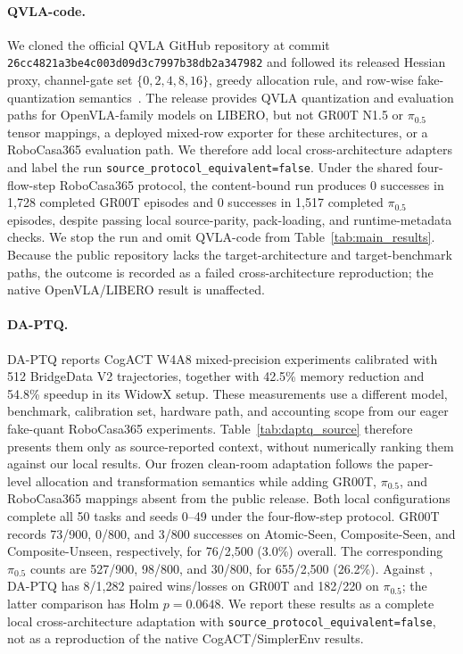 \paragraph{QVLA-code.}
We cloned the official QVLA GitHub repository at commit \texttt{26cc4821a3be4c003d09d3c7997b38db2a347982} and followed its released Hessian proxy, channel-gate set $\{0,2,4,8,16\}$, greedy allocation rule, and row-wise fake-quantization semantics~\citep{xu2026qvla}. The release provides QVLA quantization and evaluation paths for OpenVLA-family models on LIBERO, but not GR00T N1.5 or $\pi_{0.5}$ tensor mappings, a deployed mixed-row exporter for these architectures, or a RoboCasa365 evaluation path. We therefore add local cross-architecture adapters and label the run \texttt{source\_protocol\_equivalent=false}. Under the shared four-flow-step RoboCasa365 protocol, the content-bound run produces 0 successes in 1,728 completed GR00T episodes and 0 successes in 1,517 completed $\pi_{0.5}$ episodes, despite passing local source-parity, pack-loading, and runtime-metadata checks. We stop the run and omit QVLA-code from Table~\ref{tab:main_results}. Because the public repository lacks the target-architecture and target-benchmark paths, the outcome is recorded as a failed cross-architecture reproduction; the native OpenVLA/LIBERO result is unaffected.

\paragraph{DA-PTQ.}
DA-PTQ reports CogACT W4A8 mixed-precision experiments calibrated with 512 BridgeData V2 trajectories, together with 42.5\% memory reduction and 54.8\% speedup in its WidowX setup. These measurements use a different model, benchmark, calibration set, hardware path, and accounting scope from our eager fake-quant RoboCasa365 experiments. Table~\ref{tab:daptq_source} therefore presents them only as source-reported context, without numerically ranking them against our local results. Our frozen clean-room adaptation follows the paper-level allocation and transformation semantics while adding GR00T, $\pi_{0.5}$, and RoboCasa365 mappings absent from the public release. Both local configurations complete all 50 tasks and seeds 0--49 under the four-flow-step protocol. GR00T records 73/900, 0/800, and 3/800 successes on Atomic-Seen, Composite-Seen, and Composite-Unseen, respectively, for 76/2,500 (3.0\%) overall. The corresponding $\pi_{0.5}$ counts are 527/900, 98/800, and 30/800, for 655/2,500 (26.2\%). Against \method, DA-PTQ has 8/1,282 paired wins/losses on GR00T and 182/220 on $\pi_{0.5}$; the latter comparison has Holm $p=0.0648$. We report these results as a complete local cross-architecture adaptation with \texttt{source\_protocol\_equivalent=false}, not as a reproduction of the native CogACT/SimplerEnv results.

